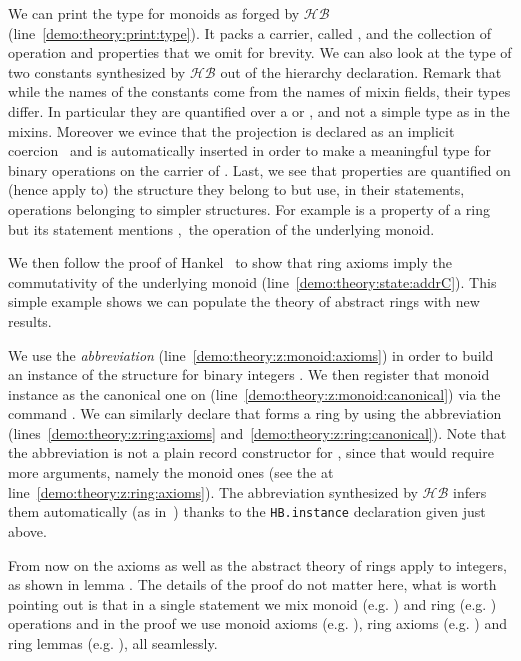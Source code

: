 \documentclass[a4paper,UKenglish,cleveref, autoref]{lipics-v2019}
\newcommand{\HB}{\ensuremath{\mathcal{HB}}}
\newcommand{\mixin}{mixin}
\newcommand{\mixins}{mixins}
\newcommand{\phantterm}{abbreviation}
\newcommand{\hbinstance}{{\tt\color{dkgreen}HB.instance}}
\theoremstyle{implem}
\theoremstyle{implem}
\theoremstyle{command}
\begin{document}
We can print the type for monoids as forged by \HB{} (line~\ref{demo:theory:print:type}).
It packs a carrier, called , and the collection of operation and
properties that we omit for brevity.  We can also look at the type of two
constants synthesized by \HB{} out of the hierarchy declaration. Remark that
while the names of the constants come from the names of \mixin{} fields,
their types differ.
In particular they are quantified over a  or ,
and not a simple type  as in the \mixins{}. Moreover we evince that
the  projection is declared as an implicit coercion~\cite{Saibi97}
and is automatically inserted in order to make  a meaningful
type for binary operations on the carrier of . Last, we see that
properties are quantified on (hence apply to) the structure they belong to but
use, in their statements, operations belonging to simpler structures.
For example  is a property of a ring but  its statement mentions ,\
the operation of the underlying monoid.

We then follow the proof of Hankel~\cite{nearrings} to show that
ring axioms imply the commutativity of the underlying monoid
(line~\ref{demo:theory:state:addrC}). This simple example shows we can
populate the theory of abstract rings with new results.

We use the  \emph{\phantterm{}}
(line~\ref{demo:theory:z:monoid:axioms})
in order to build an instance of the 
structure for binary integers .
We then register that monoid instance as the canonical one on 
(line~\ref{demo:theory:z:monoid:canonical}) via the command
.
We can similarly declare that  forms a ring by using
the  \phantterm{}
(lines~\ref{demo:theory:z:ring:axioms} and~\ref{demo:theory:z:ring:canonical}).
Note that the \coq{Ring_of_Monoid.Build} \phantterm{} is not
a plain record constructor for , since that
would require more arguments, namely the monoid ones (see the \coq{_}
at line~\ref{demo:theory:z:ring:axioms}). The
\phantterm{} synthesized by \HB{} infers them automatically
(as in~\cite[Section 7]{DBLP:conf/itp/MahboubiT13}) thanks to the \hbinstance{}
declaration given just above.

From now on the axioms as well as the abstract theory of rings apply to
integers, as shown in lemma \coq{exercise}. The details of the proof
do not matter here, what is worth pointing out is that in a single
statement we mix monoid (e.g. \coq{+}) and ring (e.g. \coq{-}) operations and in the
proof we use monoid axioms (e.g. \coq{addrA}), ring axioms
(e.g. ) and ring lemmas (e.g. ), all seamlessly.
\end{document}
